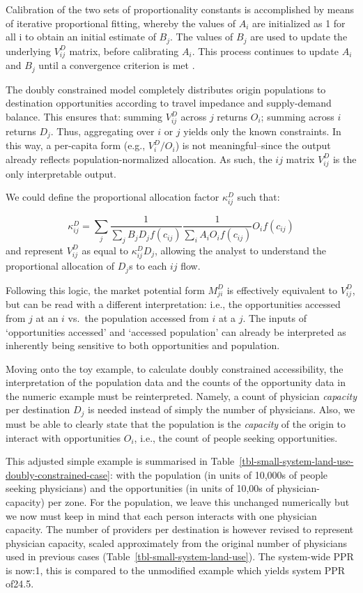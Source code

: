 \documentclass[
  10pt,
  letterpaper,
]{article}
\begin{document}
Calibration of the two sets of proportionality constants is accomplished
by means of iterative proportional fitting, whereby the values of
\(A_i\) are initialized as 1 for all i to obtain an initial estimate of
\(B_j\). The values of \(B_j\) are used to update the underlying
\(V_{ij}^D\) matrix, before calibrating \(A_i\). This process continues
to update \(A_i\) and \(B_j\) until a convergence criterion is met
\citep[see][p.~193-195]{ortuzar_2011_modelling}.

The doubly constrained model completely distributes origin populations
to destination opportunities according to travel impedance and
supply-demand balance. This ensures that: summing \(V^D_{ij}\) across
\(j\) returns \(O_i\); summing across \(i\) returns \(D_j\). Thus,
aggregating over \(i\) or \(j\) yields only the known constraints. In
this way, a per-capita form (e.g., \(V^D_i / O_i\)) is not
meaningful--since the output already reflects population-normalized
allocation. As such, the \(ij\) matrix \(V^D_{ij}\) is the only
interpretable output.

We could define the proportional allocation factor \(\kappa_{ij}^D\)
such that:

\[
\kappa_{ij}^D = \sum_j \frac{1}{\sum_j B_j D_j f(c_{ij})} \frac{1}{\sum_i A_i O_i f(c_{ij})} O_i f(c_{ij})
\] \noindent and represent \(V^D_{ij}\) as equal to
\(\kappa^D_{ij} D_j\), allowing the analyst to understand the
proportional allocation of \(D_j\)s to each \(ij\) flow.

Following this logic, the market potential form \(M^D_{ji}\) is
effectively equivalent to \(V_{ij}^D\), but can be read with a different
interpretation: i.e., the opportunities accessed from \(j\) at an \(i\)
vs.~the population accessed from \(i\) at a \(j\). The inputs of
`opportunities accessed' and `accessed population' can already be
interpreted as inherently being sensitive to both opportunities and
population.

Moving onto the toy example, to calculate doubly constrained
accessibility, the interpretation of the population data and the counts
of the opportunity data in the numeric example must be reinterpreted.
Namely, a count of physician \emph{capacity} per destination \(D_j\) is
needed instead of simply the number of physicians. Also, we must be able
to clearly state that the population is the \emph{capacity} of the
origin to interact with opportunities \(O_i\), i.e., the count of people
seeking opportunities.

This adjusted simple example is summarised in
Table~\ref{tbl-small-system-land-use-doubly-constrained-case}: with the
population (in units of 10,000s of people seeking physicians) and the
opportunities (in units of 10,00s of physician-capacity) per zone. For
the population, we leave this unchanged numerically but we now must keep
in mind that each person interacts with one physician capacity. The
number of providers per destination is however revised to represent
physician capacity, scaled approximately from the original number of
physicians used in previous cases
(Table~\ref{tbl-small-system-land-use}). The system-wide PPR is now:1,
this is compared to the unmodified example which yields system PPR
of24.5.
\end{document}
